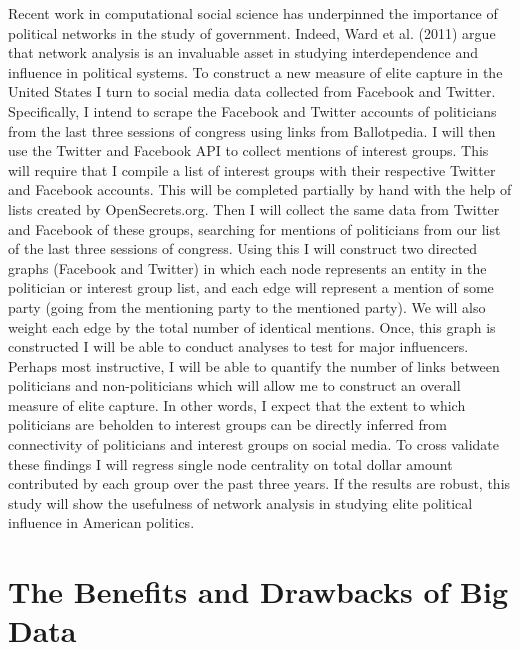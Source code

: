 \documentclass[dvips,12pt]{article}
\begin{document}
Recent work in computational social science has underpinned the importance of political networks in the study of government.\cite{RefWorks:doc:59e293d5e4b0ff0c7c11a827}  Indeed, Ward et al. (2011) argue that network analysis is an invaluable asset in studying interdependence and influence in political systems.\cite{RefWorks:doc:59e2942de4b030e7c2c3cf11}  To construct a new measure of elite capture in the United States I turn to social media data collected from Facebook and Twitter. Specifically, I intend to scrape the Facebook and Twitter accounts of politicians from the last three sessions of congress using links from Ballotpedia.  I will then use the Twitter and Facebook API to collect mentions of interest groups. This will require that I compile a list of interest groups with their respective Twitter and Facebook accounts. This will be completed partially by hand with the help of lists created by OpenSecrets.org.  Then I will collect the same data from Twitter and Facebook of these groups, searching for mentions of politicians from our list of the last three sessions of congress. Using this I will construct two directed graphs (Facebook and Twitter) in which each node represents an entity in the politician or interest group list, and each edge will represent a mention of some party (going from the mentioning party to the mentioned party). We will also weight each edge by the total number of identical mentions. Once, this graph is constructed I will be able to conduct analyses to test for major influencers. Perhaps most instructive, I will be able to quantify the number of links between politicians and non-politicians which will allow me to construct an overall measure of elite capture. In other words, I expect that the extent to which politicians are beholden to interest groups can be directly inferred from connectivity of politicians and interest groups on social media. To cross validate these findings I will regress single node centrality on total dollar amount contributed by each group over the past three years.\cite{RefWorks:doc:59e29490e4b0b4635e033b3b}  If the results are robust, this study will show the usefulness of network analysis in studying elite political influence in American politics. 

\section{The Benefits and Drawbacks of Big Data}
\end{document}
